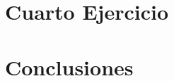 \documentclass[a4paper]{article}
\begin{document}
	\begin{figure}[H]
		\centering
		\hfill
	\end{figure}
	
	\newpage
	
	\section{Cuarto Ejercicio}
	
	\newpage
	
	\section{Conclusiones}
	
	\newpage
	
\end{document}
